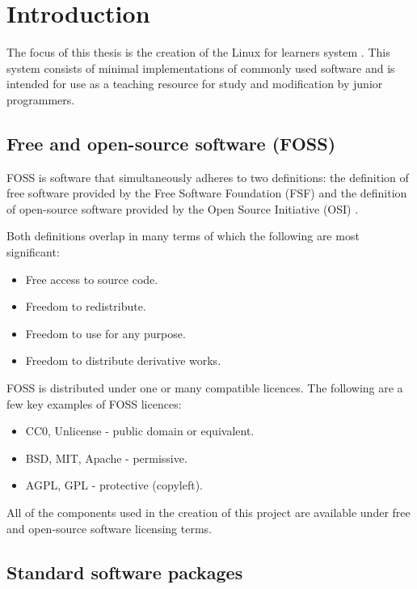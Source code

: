 \section{Introduction}\label{Introduction}

The focus of this thesis is the creation of the Linux for learners system \cite{lfl}. This system consists of minimal implementations of commonly used software and is intended for use as a teaching resource for study and modification by junior programmers.

\subsection{Free and open-source software (FOSS)}

FOSS is software that simultaneously adheres to two definitions: the definition of free software provided by the Free Software Foundation (FSF) \cite{fsf} and the definition of open-source software provided by the Open Source Initiative (OSI) \cite{osi}.

Both definitions overlap in many terms of which the following are most significant:

\begin{itemize}
    \item Free access to source code.
    \item Freedom to redistribute.
    \item Freedom to use for any purpose.
    \item Freedom to distribute derivative works.
\end{itemize}

FOSS is distributed under one or many compatible licences. The following are a few key examples of FOSS licences:

\begin{itemize}
    \item CC0, Unlicense - public domain or equivalent.
    \item BSD, MIT, Apache - permissive.
    \item AGPL, GPL - protective (copyleft).
\end{itemize}

All of the components used in the creation of this project are available under free and open-source software licensing terms.

\subsection{Standard software packages}

